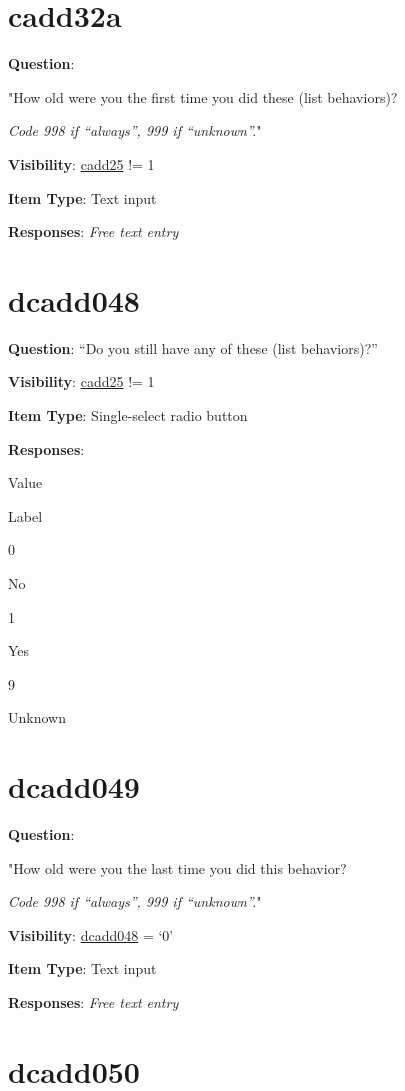 \documentclass[]{book}
\begin{document}
\hypertarget{cadd32a}{%
\section{cadd32a}\label{cadd32a}}

\textbf{Question}:

"How old were you the first time you did these (list behaviors)?

\emph{Code 998 if ``always'', 999 if ``unknown''.}"

\textbf{Visibility}: \protect\hyperlink{cadd25}{cadd25} != 1

\textbf{Item Type}: Text input

\textbf{Responses}: \emph{Free text entry}

\hypertarget{dcadd048}{%
\section{dcadd048}\label{dcadd048}}

\textbf{Question}: ``Do you still have any of these (list behaviors)?''

\textbf{Visibility}: \protect\hyperlink{cadd25}{cadd25} != 1

\textbf{Item Type}: Single-select radio button

\textbf{Responses}:

Value

Label

0

No

1

Yes

9

Unknown

\hypertarget{dcadd049}{%
\section{dcadd049}\label{dcadd049}}

\textbf{Question}:

"How old were you the last time you did this behavior?

\emph{Code 998 if ``always'', 999 if ``unknown''.}"

\textbf{Visibility}: \protect\hyperlink{dcadd048}{dcadd048} = `0'

\textbf{Item Type}: Text input

\textbf{Responses}: \emph{Free text entry}

\hypertarget{dcadd050}{%
\section{dcadd050}\label{dcadd050}}
\end{document}
